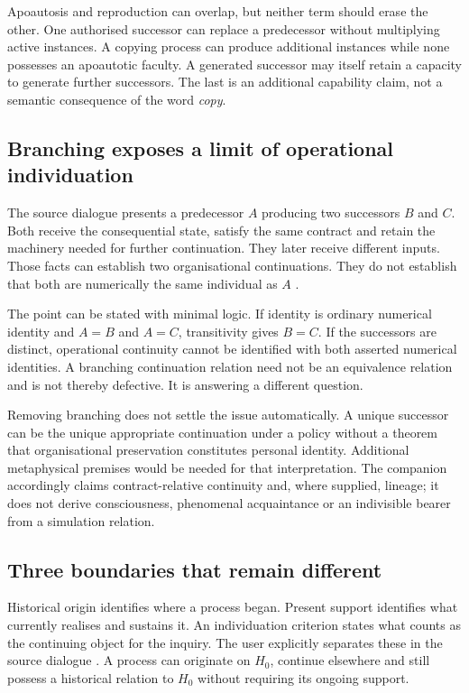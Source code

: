 Apoautosis and reproduction can overlap, but neither term should erase the other. One authorised successor can replace a predecessor without multiplying active instances. A copying process can produce additional instances while none possesses an apoautotic faculty. A generated successor may itself retain a capacity to generate further successors. The last is an additional capability claim, not a semantic consequence of the word \emph{copy}.

\subsection{Branching exposes a limit of operational individuation}

The source dialogue presents a predecessor \(A\) producing two successors \(B\) and \(C\). Both receive the consequential state, satisfy the same contract and retain the machinery needed for further continuation. They later receive different inputs. Those facts can establish two organisational continuations. They do not establish that both are numerically the same individual as \(A\) \cite[07:18:51--07:22:32]{D}.

The point can be stated with minimal logic. If identity is ordinary numerical identity and \(A=B\) and \(A=C\), transitivity gives \(B=C\). If the successors are distinct, operational continuity cannot be identified with both asserted numerical identities. A branching continuation relation need not be an equivalence relation and is not thereby defective. It is answering a different question.

Removing branching does not settle the issue automatically. A unique successor can be the unique appropriate continuation under a policy without a theorem that organisational preservation constitutes personal identity. Additional metaphysical premises would be needed for that interpretation. The companion accordingly claims contract-relative continuity and, where supplied, lineage; it does not derive consciousness, phenomenal acquaintance or an indivisible bearer from a simulation relation.

\subsection{Three boundaries that remain different}

Historical origin identifies where a process began. Present support identifies what currently realises and sustains it. An individuation criterion states what counts as the continuing object for the inquiry. The user explicitly separates these in the source dialogue \cite[06:57:37]{D}. A process can originate on \(H_0\), continue elsewhere and still possess a historical relation to \(H_0\) without requiring its ongoing support.

